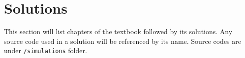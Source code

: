 
\section*{Solutions}

This section will list chapters of the textbook followed by its solutions. Any
source code used in a solution will be referenced by its name. Source codes
are under \texttt{/simulations} folder.

\pagebreak


%

\pagebreak
